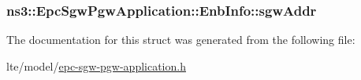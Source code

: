 \subsubsection[{\texorpdfstring{sgw\+Addr}{sgwAddr}}]{ ns3\+::\+Epc\+Sgw\+Pgw\+Application\+::\+Enb\+Info\+::sgw\+Addr}\hypertarget{structns3_1_1EpcSgwPgwApplication_1_1EnbInfo_a28e1e6acf7bea3aa8488f98e2e69e546}{}\label{structns3_1_1EpcSgwPgwApplication_1_1EnbInfo_a28e1e6acf7bea3aa8488f98e2e69e546}


The documentation for this struct was generated from the following file\+:\begin{DoxyCompactItemize}
\item 
lte/model/\hyperlink{epc-sgw-pgw-application_8h}{epc-\/sgw-\/pgw-\/application.\+h}\end{DoxyCompactItemize}
